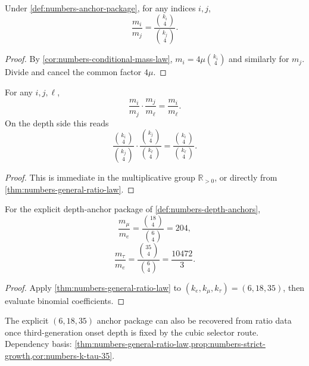 \begin{theorem}
\label{thm:numbers-general-ratio-law}
Under \cref{def:numbers-anchor-package}, for any indices \(i,j\),
\[
  \frac{m_i}{m_j}
  =
  \frac{\binom{k_i}{4}}{\binom{k_j}{4}}.
\]
\end{theorem}

\begin{proof}
By \cref{cor:numbers-conditional-mass-law},
\(
  m_i=4\mu\binom{k_i}{4}
\)
and similarly for \(m_j\).
Divide and cancel the common factor \(4\mu\).
\end{proof}

\begin{proposition}
\label{prop:numbers-ratio-transitivity}
For any \(i,j,\ell\),
\[
  \frac{m_i}{m_j}\cdot\frac{m_j}{m_\ell}=\frac{m_i}{m_\ell}.
\]
On the depth side this reads
\[
  \frac{\binom{k_i}{4}}{\binom{k_j}{4}}
  \cdot
  \frac{\binom{k_j}{4}}{\binom{k_\ell}{4}}
  =
  \frac{\binom{k_i}{4}}{\binom{k_\ell}{4}}.
\]
\end{proposition}

\begin{proof}
This is immediate in the multiplicative group \(\mathbb R_{>0}\),
or directly from \cref{thm:numbers-general-ratio-law}.
\end{proof}

\begin{corollary}
\label{cor:numbers-anchor-61835}
For the explicit depth-anchor package of \cref{def:numbers-depth-anchors},
\[
  \frac{m_\mu}{m_e}=\frac{\binom{18}{4}}{\binom{6}{4}}=204,
\]
\[
  \frac{m_\tau}{m_e}=\frac{\binom{35}{4}}{\binom{6}{4}}=\frac{10472}{3}.
\]
\end{corollary}

\begin{proof}
Apply \cref{thm:numbers-general-ratio-law} to
\((k_e,k_\mu,k_\tau)=(6,18,35)\), then evaluate binomial coefficients.
\end{proof}

The explicit \((6,18,35)\) anchor package can also be recovered from
ratio data once third-generation onset depth is fixed by the cubic
selector route.
Dependency basis:
\cref{thm:numbers-general-ratio-law,prop:numbers-strict-growth,cor:numbers-k-tau-35}.

